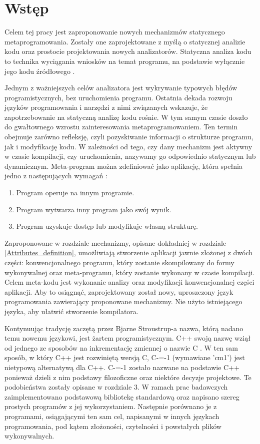 \section{Wstęp}
Celem tej pracy jest zaproponowanie nowych mechanizmów statycznego 
metaprogramowania.
Zostały one zaprojektowane z myślą o statycznej analizie kodu oraz prostocie projektowania nowych analizatorów.
Statyczna analiza kodu to technika wyciągania wniosków na temat programu, na podstawie wyłącznie jego kodu źródłowego \cite{survey_of_metaprograming}.

Jednym z ważniejszych celów analizatora jest wykrywanie typowych błędów programistycznych, bez uruchomienia programu.
Ostatnia dekada rozwoju języków programowania i narzędzi z nimi związanych wskazuje, że zapotrzebowanie na statyczną analizę kodu rośnie.
W tym samym czasie doszło do gwałtownego wzrostu zainteresowania metaprogramowaniem. Ten termin obejmuje zarówno refleksję, czyli pozyskiwanie informacji o strukturze programu, jak i modyfikację kodu. W zależności od tego, czy dany mechanizm jest aktywny w czasie kompilacji, czy uruchomienia, nazywamy go odpowiednio statycznym lub dynamicznym.
Meta-program można zdefiniować jako aplikację, która spełnia jedno z następujących wymagań \cite{nielson2004principles}:
\begin{enumerate}
\item Program operuje na innym programie.
\item Program wytwarza inny program jako swój wynik.
\item Program uzyskuje dostęp lub modyfikuje własną strukturę.
\end{enumerate}

Zaproponowane w rozdziale mechanizmy, opisane dokładniej w rozdziale \ref{Attributes_definition}, umożliwiają stworzenie aplikacji jawnie złożonej z dwóch części:
konwencjonalnego programu, który zostanie skompilowany do formy wykonywalnej oraz meta-programu, który zostanie wykonany w czasie kompilacji.
Celem meta-kodu jest wykonanie analizy oraz modyfikacji konwencjonalnej części aplikacji.
Aby to osiągnąć, zaprojektowany został nowy, uproszczony język programowania zawierający proponowane mechanizmy.
Nie użyto istniejącego języka, aby ułatwić stworzenie kompilatora.

Kontynuując tradycję zaczętą przez Bjarne Stroustrup-a nazwa, którą nadano temu nowemu językowi, jest żartem programistycznym. C++ swoją nazwę wziął od jednego ze sposobów na inkrementację zmiennej o nazwie C \cite{stroustrup_com}. 
W ten sam sposób, w który C++ jest rozwiniętą wersją C, C-=-1 (wymawiane 'cm1') jest nietypową alternatywą dla C++. C-=-1 zostało nazwane na podstawie C++ ponieważ dzieli z nim podstawy filozoficzne oraz niektóre decyzje projektowe. Te podobieństwa zostały opisane w rozdziale 3.
W ramach prac badawczych zaimplementowano podstawową bibliotekę standardową oraz napisano szereg prostych programów z jej wykorzystaniem. Następnie porównano je z programami, osiągającymi ten sam cel, napisanymi w innych językach programowania, pod kątem złożoności, czytelności i powstałych plików wykonywalnych.
